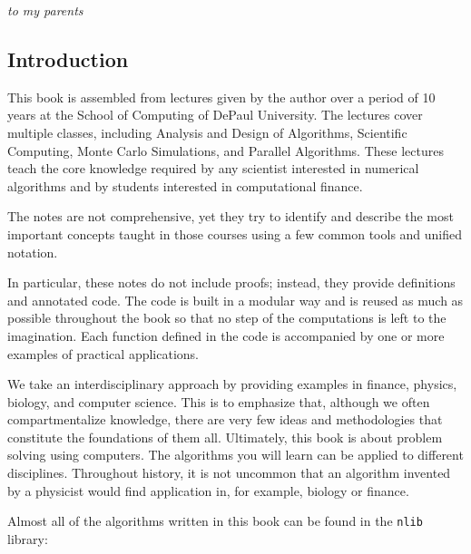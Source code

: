 \documentclass[justified,sixbynine]{tufte-book}
\def\ft{\small\tt}
\theoremstyle{plain}%
\theoremstyle{definition}
\theoremstyle{remark}
\begin{document}
\newpage
\thispagestyle{empty}
\phantom{placeholder}
\vspace{2in}
\hskip 3in
{\it to my parents}
\newpage
\thispagestyle{empty}
\phantom {a}
\newpage

\setlength{\cftparskip}{\baselineskip}
\tableofcontents

\mainmatter
\begin{fullwidth}

\goodbreak\chapter{Introduction}

This book is assembled from lectures given by the author over a period of 10 years at the School of Computing of DePaul University. The lectures cover multiple classes, including Analysis and Design of Algorithms, Scientific Computing, Monte Carlo Simulations, and Parallel Algorithms. These lectures teach the core knowledge required by any scientist interested in numerical algorithms and by students interested in computational finance.

The notes are not comprehensive, yet they try to identify and describe the most important concepts taught in those courses using a few common tools and unified notation.

In particular, these notes do not include proofs; instead, they provide definitions and annotated code. The code is built in a modular way and is reused as much as possible throughout the book so that no step of the computations is left to the imagination. Each function defined in the code is accompanied by one or more examples of practical applications.

We take an interdisciplinary approach by providing examples in finance, physics, biology, and computer science. This is to emphasize that, although we often compartmentalize knowledge, there are very few ideas and methodologies that constitute the foundations of them all. Ultimately, this book is about problem solving using computers. The algorithms you will learn can be applied to different disciplines. Throughout history, it is not uncommon that an algorithm invented by a physicist would find application in, for example, biology or finance.

Almost all of the algorithms written in this book can be found in the {\ft nlib} library:


\end{fullwidth}
\end{document}
